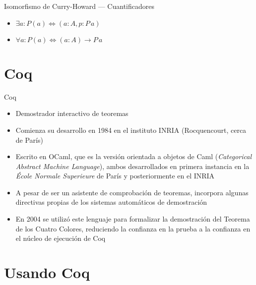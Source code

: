 \documentclass[10pt]{beamer}
\begin{document}
\begin{frame}[fragile]{Isomorfismo de Curry-Howard --- Cuantificadores}

  \begin{itemize}
  \item $\exists a : P(a) \iff (a : A, p : P \, a)$
  \item $\forall a : P(a) \iff (a : A) \rightarrow P \, a$
  \end{itemize}

\end{frame}

\section{Coq}

\begin{frame}[fragile]{Coq}

  \begin{itemize}
  \item Demostrador interactivo de teoremas
  \item Comienza su desarrollo en 1984 en el instituto INRIA
    (Rocquencourt, cerca de París)
  \item Escrito en OCaml, que es la versión orientada a objetos de
    Caml (\textit{Categorical Abstract Machine Language}), ambos
    desarrollados en primera instancia en la \textit{École Normale
      Superieure} de París y posteriormente en el INRIA
  \item A pesar de ser un asistente de comprobación de teoremas,
    incorpora algunas directivas propias de los sistemas automáticos
    de demostración
  \item En 2004 se utilizó este lenguaje para formalizar la
    demostración del Teorema de los Cuatro Colores, reduciendo la
    confianza en la prueba a la confianza en el núcleo de ejecución
    de Coq
  \end{itemize}

\end{frame}

\section{Usando Coq}
\end{document}
